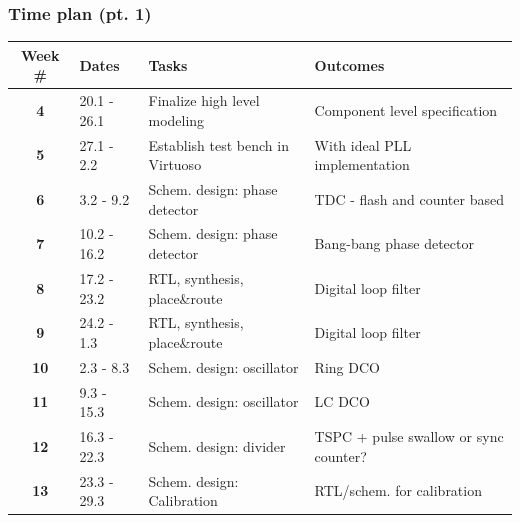 \documentclass[t, screen, aspectratio=43]{beamer}
\begin{document}
\begin{frame}
	\frametitle{Time plan (pt. 1)}
	\begin{table}[htb!]
		\tiny
		\centering
		\vspace{-1em}
		\def\arraystretch{1.5}		
		\setlength\arrayrulewidth{0.75pt}
		\setlength{\tabcolsep}{1em} %
		\begin{tabular}{|c|l|l|l|}
			\hline 
			\rule[-1ex]{0pt}{2.5ex}\cellcolor{gray!40}\textbf{Week \#} & \cellcolor{gray!40}\textbf{Dates} &\cellcolor{gray!40}\textbf{Tasks} & \cellcolor{gray!40}\textbf{Outcomes}\\ 
			\hline 
			\rule[-1ex]{0pt}{2.5ex}\cellcolor{red!40}\textbf{4}&\cellcolor{red!40}20.1 - 26.1 &\cellcolor{red!40}Finalize high level modeling &\cellcolor{red!40}Component level specification\\ 
			\hline 
			\rule[-1ex]{0pt}{2.5ex}\textbf{5}\cellcolor{red!40}&\cellcolor{red!40}27.1 - 2.2 &\cellcolor{red!40}Establish test bench in Virtuoso &\cellcolor{red!40}With ideal PLL implementation\\ 
			\hline 
			\rule[-1ex]{0pt}{2.5ex}\cellcolor{green!40}\textbf{6}&\cellcolor{green!40}3.2 - 9.2&\cellcolor{green!40}Schem. design: phase detector &\cellcolor{green!40}TDC - flash and counter based \\ 
			\hline 
			\rule[-1ex]{0pt}{2.5ex}\textbf{7}& 10.2 - 16.2& Schem. design: phase detector & Bang-bang phase detector\\ 
			\hline 
			\rule[-1ex]{0pt}{2.5ex}\textbf{8}&17.2 - 23.2& RTL, synthesis, place\&route & Digital loop filter\\ 
			\hline 
			\rule[-1ex]{0pt}{2.5ex}\textbf{9}&24.2 - 1.3& RTL, synthesis, place\&route & Digital loop filter\\ 
			\hline 
			\rule[-1ex]{0pt}{2.5ex}\textbf{10}&2.3 - 8.3& Schem. design: oscillator & Ring DCO\\ 
			\hline 
			\rule[-1ex]{0pt}{2.5ex}\textbf{11}&9.3 - 15.3& Schem. design: oscillator & LC DCO\\ 
			\hline 
			\rule[-1ex]{0pt}{2.5ex}\textbf{12}&16.3 - 22.3& Schem. design: divider  &TSPC + pulse swallow or sync counter?\\ 
			\hline 
			\rule[-1ex]{0pt}{2.5ex}\textbf{13}&23.3 - 29.3&Schem. design: Calibration& RTL/schem. for calibration\\ 

\end{tabular}
\end{table}
\end{frame}
\end{document}
